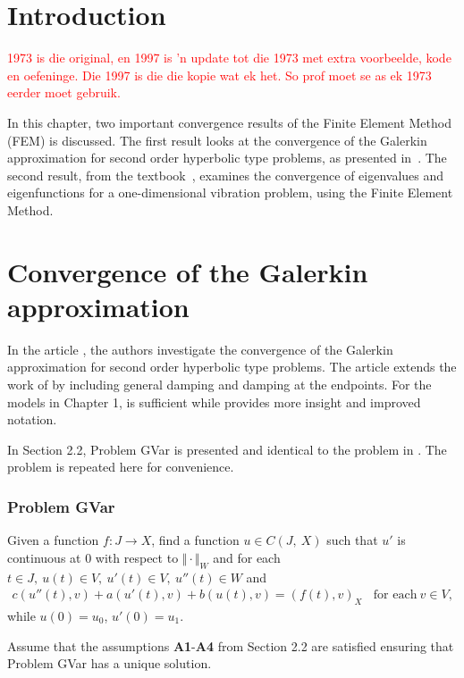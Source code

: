 \documentclass[../../main.tex]{subfiles}
\begin{document}
\section{Introduction}
\textcolor{red}{1973 is die original, en 1997 is 'n update tot die 1973 met extra voorbeelde, kode en oefeninge. Die 1997 is die die kopie wat ek het. So prof moet se as ek 1973 eerder moet gebruik.}

In this chapter, two important convergence results of the Finite Element Method
(FEM) is discussed. The first result looks at the convergence of the Galerkin
approximation for second order hyperbolic type problems, as presented
in~\cite{BV13}. The second result, from the textbook~\cite{SF97}, examines the
convergence of eigenvalues and eigenfunctions for a one-dimensional vibration
problem, using the Finite Element Method.

\section{Convergence of the Galerkin approximation}\label{sec:convergence-of-the-galerkin-approximation}
In the article \cite{BV13}, the authors investigate the convergence of the
Galerkin approximation for second order hyperbolic type problems. The article
\cite{BV18} extends the work of \cite{BV13} by including general damping and
damping at the endpoints. For the models in Chapter 1, \cite{BV13} is
sufficient while \cite{BV18} provides more insight and improved notation.

In Section 2.2, Problem GVar is presented and identical to the problem in
\cite{BV13}. The problem is repeated here for convenience.

\subsubsection*{Problem GVar}
Given a function $f:J\rightarrow X$, find a function $u\in C(J,\ X)$ such that $u'$ is continuous at $0$ with respect to
$\Vert \cdot \Vert_{W}$ and for each $t\in J,\ u(t)\in V,\ u'(t) \in V,\ u''(t)\in W$ and
\begin{eqnarray}
	c(u''(t),v)+a(u'(t),v)+b(u(t),v)= (f(t),v)_{X} \ \ \ \ \textrm{for each} \ v \in V, \label{GV_PB1}
\end{eqnarray}
while $u(0)=u_{0}$, $u'(0)=u_{1}$.

Assume that the assumptions \textbf{A1}-\textbf{A4} from Section 2.2 are
satisfied ensuring that Problem GVar has a unique solution.
\end{document}
